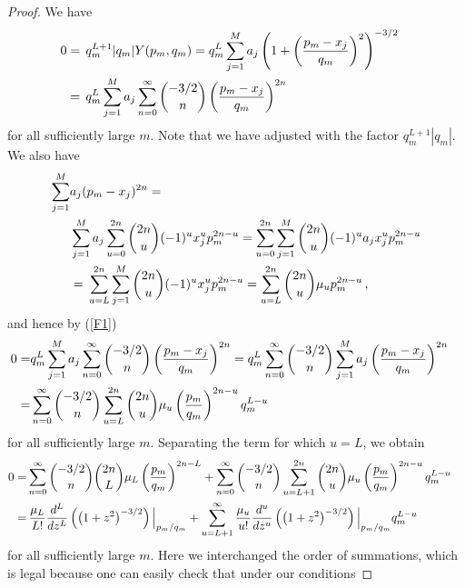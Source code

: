 \documentclass{article}
\theoremstyle{remark}
\numberwithin{equation}{section}
\begin{document}
\begin{proof}
We have
\begin{equation} \notag
\begin{split}
0 & = \,  q_m^{L+1}|q_m|Y(p_m,q_m) =  q_m^{L}\sum_{j=1}^M{a_j \left(1 + \left( \frac{p_m-x_j}{q_m} \right)^2 \right)^{-3/2}} \cr
& = \, q_m^{L}\sum_{j=1}^M{a_j \sum_{n=0}^\infty{\binom{-3/2}{n} \left( \frac{p_m-x_j}{q_m} \right)^{2n}}} \cr
\end{split}
\end{equation}
for all sufficiently large $m$. Note that we have adjusted with the factor $q_m^{L+1}|q_m|$. We also have 
\begin{equation} \label{F1} 
\begin{split}
\sum_{j=1}^M & {a_j(p_m-x_j)^{2n}} =\\ 
\quad & \sum_{j=1}^M{a_j \sum_{u=0}^{2n}{\binom{2n}{u}(-1)^ux_j^up_m^{2n-u}}} 
= \sum_{u=0}^{2n}{\sum_{j=1}^M{\binom{2n}{u}(-1)^ua_jx_j^up_m^{2n-u}}} \cr 
& = \, \sum_{u=L}^{2n}{\sum_{j=1}^M{\binom{2n}{u}(-1)^ux_j^u p_m^{2n-u}}} = \sum_{u=L}^{2n}{\binom {2n}{u} \mu_u p_m^{2n-u}}\,, \cr 
\end{split}
\end{equation}
and hence by (\ref{F1})
\begin{equation} \notag \begin{split}
0 = & q_m^{L}\sum_{j=1}^M{a_j \sum_{n=0}^\infty{\binom{-3/2}{n} \left( \frac{p_m-x_j}{q_m} \right)^{2n}}} 
= q_m^{L}\sum_{n=0}^\infty{ \binom{-3/2}{n} \sum_{j=1}^M{a_j \left( \frac{p_m-x_j}{q_m} \right)^{2n}}} \cr
= &  \sum_{n=0}^\infty{\binom {-3/2}{n} \sum_{u=L}^{2n}{\binom{2n}{u} \mu_u \left( \frac{p_m}{q_m} \right)^{2n-u} q_m^{L-u}}} \cr
\end{split}\end{equation}
for all sufficiently large $m$. Separating the term for which $u=L$, we obtain  
\begin{equation}\label{F2} \begin{split}
0 = & \sum_{n=0}^\infty{\binom {-3/2}{n} {\binom{2n}{L} \mu_L \left( \frac{p_m}{q_m} \right)^{2n-L}}} 
+ \sum_{n=0}^\infty{\binom {-3/2}{n} \sum_{u=L+1}^{2n}{\binom{2n}{u} \mu_u \left( \frac{p_m}{q_m} \right)^{2n-u} q_m^{L-u}}} \cr 
= & \, \frac{\mu_L}{L!} \frac{d^L}{dz^L} \left( \left( 1 + z^2 \right)^{-3/2} \right) \Big|_{p_m/q_m}
+ \sum_{u=L+1}^\infty{\frac{\mu_u}{u!} \frac{d^u}{dz^u} \left( \left( 1 + z^2 \right)^{-3/2} \right) \Big|_{p_m/q_m}} q_m^{L-u} \cr
\end{split}\end{equation}
for all sufficiently large $m$. Here we interchanged the order of summations, which is legal because one can easily check that under our conditions

\end{proof}
\end{document}

